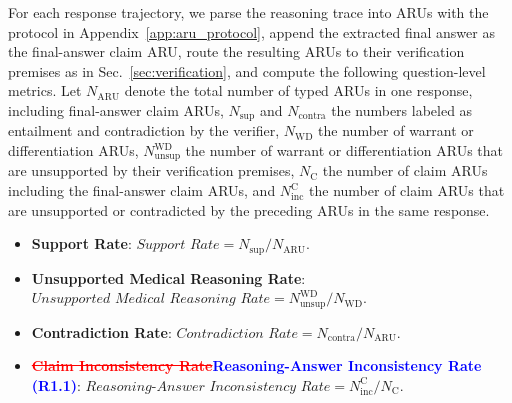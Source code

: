 \documentclass[a4paper,fleqn,doubleblind]{cas-sc}
\DeclareRobustCommand{\deleted}[1]{\textcolor{red}{\sout{#1}}}
\DeclareRobustCommand{\added}[1]{\textcolor{blue}{#1}}
\DeclareRobustCommand{\revtag}[1]{\textcolor{blue}{\scriptsize\,(\textbf{#1})}}
\begin{document}
For each response trajectory, we parse the reasoning trace into ARUs with the protocol in Appendix~\ref{app:aru_protocol}, append the extracted final answer as the final-answer claim ARU, route the resulting ARUs to their verification premises as in Sec.~\ref{sec:verification}, and compute the following question-level metrics. Let $N_{\text{ARU}}$ denote the total number of typed ARUs in one response, including final-answer claim ARUs, $N_{\text{sup}}$ and $N_{\text{contra}}$ the numbers labeled as entailment and contradiction by the verifier, $N_{\text{WD}}$ the number of warrant or differentiation ARUs, $N_{\text{unsup}}^{\text{WD}}$ the number of warrant or differentiation ARUs that are unsupported by their verification premises, $N_{\text{C}}$ the number of claim ARUs including the final-answer claim ARUs, and $N_{\text{inc}}^{\text{C}}$ the number of claim ARUs that are unsupported or contradicted by the preceding ARUs in the same response.
\begin{itemize}[leftmargin=*]
    \item \textbf{Support Rate}: $\textit{Support Rate} = N_{\text{sup}} / N_{\text{ARU}}$.
    \item \textbf{Unsupported Medical Reasoning Rate}: $\textit{Unsupported Medical Reasoning Rate} = N_{\text{unsup}}^{\text{WD}} / N_{\text{WD}}$.
    \item \textbf{Contradiction Rate}: $\textit{Contradiction Rate} = N_{\text{contra}} / N_{\text{ARU}}$.
    \item \textbf{\deleted{Claim Inconsistency Rate}\added{Reasoning-Answer Inconsistency Rate}\revtag{R1.1}}: $\textit{Reasoning-Answer Inconsistency Rate} = N_{\text{inc}}^{\text{C}} / N_{\text{C}}$.
\end{itemize}
\end{document}
